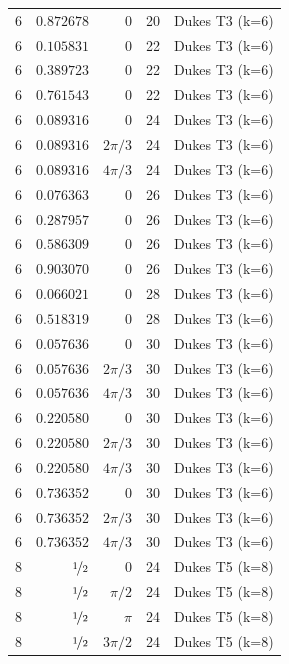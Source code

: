\begin{longtable}{rrrrc}
6 & $0.872678$ & $0$ & 20 & Dukes T3 (k=6) \\
6 & $0.105831$ & $0$ & 22 & Dukes T3 (k=6) \\
6 & $0.389723$ & $0$ & 22 & Dukes T3 (k=6) \\
6 & $0.761543$ & $0$ & 22 & Dukes T3 (k=6) \\
6 & $0.089316$ & $0$ & 24 & Dukes T3 (k=6) \\
6 & $0.089316$ & $2\pi/3$ & 24 & Dukes T3 (k=6) \\
6 & $0.089316$ & $4\pi/3$ & 24 & Dukes T3 (k=6) \\
6 & $0.076363$ & $0$ & 26 & Dukes T3 (k=6) \\
6 & $0.287957$ & $0$ & 26 & Dukes T3 (k=6) \\
6 & $0.586309$ & $0$ & 26 & Dukes T3 (k=6) \\
6 & $0.903070$ & $0$ & 26 & Dukes T3 (k=6) \\
6 & $0.066021$ & $0$ & 28 & Dukes T3 (k=6) \\
6 & $0.518319$ & $0$ & 28 & Dukes T3 (k=6) \\
6 & $0.057636$ & $0$ & 30 & Dukes T3 (k=6) \\
6 & $0.057636$ & $2\pi/3$ & 30 & Dukes T3 (k=6) \\
6 & $0.057636$ & $4\pi/3$ & 30 & Dukes T3 (k=6) \\
6 & $0.220580$ & $0$ & 30 & Dukes T3 (k=6) \\
6 & $0.220580$ & $2\pi/3$ & 30 & Dukes T3 (k=6) \\
6 & $0.220580$ & $4\pi/3$ & 30 & Dukes T3 (k=6) \\
6 & $0.736352$ & $0$ & 30 & Dukes T3 (k=6) \\
6 & $0.736352$ & $2\pi/3$ & 30 & Dukes T3 (k=6) \\
6 & $0.736352$ & $4\pi/3$ & 30 & Dukes T3 (k=6) \\
8 & $\nicefrac{1}{2}$ & $0$ & 24 & Dukes T5 (k=8) \\
8 & $\nicefrac{1}{2}$ & $\pi/2$ & 24 & Dukes T5 (k=8) \\
8 & $\nicefrac{1}{2}$ & $\pi$ & 24 & Dukes T5 (k=8) \\
8 & $\nicefrac{1}{2}$ & $3\pi/2$ & 24 & Dukes T5 (k=8) \\
\end{longtable}

